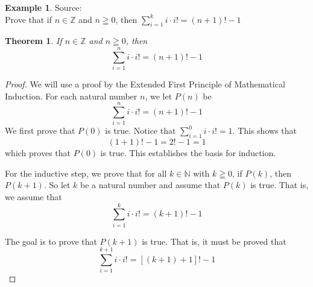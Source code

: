 \documentclass{book}
\newtheorem{theorem}{Theorem}[section]
\theoremstyle{definition}
\newtheorem{example}{Example}[definition]
\theoremstyle{remark}
\newcommand{\bb}[1]{\mathbb{#1}}
\newcommand{\m}{\cdot}
\begin{document}
\newpage
\begin{example}
Source: \cite[C.10]{Hammack} \\ 
Prove that if $n \in \bb{Z}$ and $n \geqq 0$, then $\sum_{i=1}^{k}{i \m i!} = (n+1)! - 1$

\begin{tcolorbox}
    \begin{theorem}
        If $n \in \bb{Z}$ and $n \geqq 0$, then
        \begin{equation*}
             \sum_{i=1}^{n}{i \m i!} = (n+1)! - 1                
        \end{equation*}
    \end{theorem}
\end{tcolorbox}

\begin{proof}
        We will use a proof by the Extended First Principle of Mathematical Induction. For each natural number $n$, we let $P(n)$ be
            \begin{equation*}
                \sum_{i=1}^{n}{i \m i!} = (n+1)! - 1  
            \end{equation*}
        We first prove that $P(0)$ is true. Notice that $\sum_{i=1}^{0}{i \m i!} = 1$. This shows that   
            \begin{equation*}
                 (1+1)! - 1 = 2! - 1 = 1
            \end{equation*}
        which proves that $P(0)$ is true. This establishes the basis for induction. 
        
        For the inductive step, we prove that for all $k \in \bb{N}$ with $k \geqq 0$, if $P(k)$, then $P(k+1)$. So let $k$ be a natural number and assume that $P(k)$ is true. That is, we assume that 
            \begin{equation*}
                \sum_{i=1}^{k}{i \m i!} = (k+1)! - 1               
            \end{equation*}
        
        The goal is to prove that $P(k+1)$ is true. That is, it must be proved that  
            \begin{equation}
            \label{dne7}
                \sum_{i=1}^{k+1}{i \m i!} = [(k+1)+1]! - 1          
            \end{equation}
        

\end{proof}
\end{example}
\end{document}
